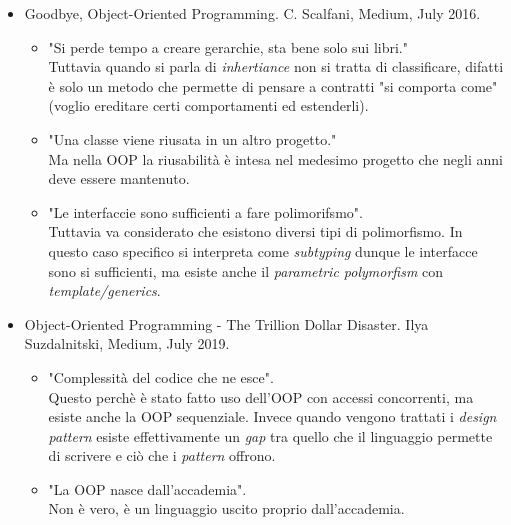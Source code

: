 \documentclass[10pt,a4paper]{book}
\begin{document}
\begin{itemize}
\item Goodbye, Object-Oriented Programming. C. Scalfani, Medium, July 2016.
\begin{itemize}
\item "Si perde tempo a creare gerarchie, sta bene solo sui libri."\\
Tuttavia quando si parla di \textit{inhertiance} non si tratta di classificare, difatti \`e solo un metodo che permette di pensare a contratti "si comporta come" (voglio ereditare certi comportamenti ed estenderli).
\item "Una classe viene riusata in un altro progetto."\\
Ma nella OOP la riusabilit\`a \`e intesa nel medesimo progetto che negli anni deve essere mantenuto.
\item "Le interfaccie sono sufficienti a fare polimorifsmo".\\
Tuttavia va considerato che esistono diversi tipi di polimorfismo. In questo caso specifico si interpreta come \textit{subtyping} dunque le interfacce sono si sufficienti, ma esiste anche il \textit{parametric polymorfism} con \textit{template/generics}.
\end{itemize}
\item Object-Oriented Programming - The Trillion Dollar Disaster. Ilya Suzdalnitski, Medium, July 2019.
\begin{itemize}
\item "Complessit\`a del codice che ne esce".\\
Questo perch\`e \`e stato fatto uso dell'OOP con accessi concorrenti, ma esiste anche la OOP sequenziale. Invece quando vengono trattati i \textit{design pattern} esiste effettivamente un \textit{gap} tra quello che il linguaggio permette di scrivere e ci\`o che i \textit{pattern} offrono.
\item "La OOP nasce dall'accademia".\\
Non \`e vero, \`e un linguaggio uscito proprio dall'accademia.
\end{itemize}
\end{itemize}
\noindent
\end{document}

